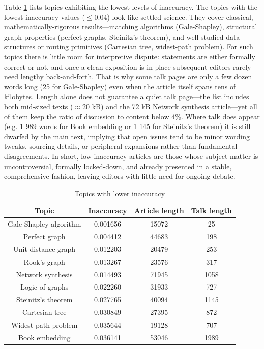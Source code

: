 Table \ref{tab:Lower-inaccuracy-of-topics} lists topics exhibiting the lowest levels of inaccuracy. The topics with the lowest inaccuracy values ($\leq 0.04$) look like settled science. They cover classical, mathematically-rigorous results—matching algorithms (Gale-Shapley), structural graph properties (perfect graphs, Steinitz's theorem), and well-studied data-structures or routing primitives (Cartesian tree, widest-path problem). For such topics there is little room for interpretive dispute: statements are either formally correct or not, and once a clean exposition is in place subsequent editors rarely need lengthy back-and-forth. That is why some talk pages are only a few dozen words long (25 for Gale-Shapley) even when the article itself spans tens of kilobytes. Length alone does not guarantee a quiet talk page—the list includes both mid-sized texts ($\approx 20$ kB) and the 72 kB Network synthesis article—yet all of them keep the ratio of discussion to content below 4\%. Where talk does appear (e.g. 1 989 words for Book embedding or 1 145 for Steinitz's theorem) it is still dwarfed by the main text, implying that open issues tend to be minor wording tweaks, sourcing details, or peripheral expansions rather than fundamental disagreements. In short, low-inaccuracy articles are those whose subject matter is uncontroversial, formally locked-down, and already presented in a stable, comprehensive fashion, leaving editors with little need for ongoing debate.

\begin{table}
\begin{centering}
\begin{tabular}{|c|c|c|c|}
\hline 
Topic & Inaccuracy & Article length & Talk length \tabularnewline
\hline 
\hline
Gale-Shapley algorithm & 0.001656 & 15072 & 25 \tabularnewline
\hline
Perfect graph & 0.004412 & 44683 & 198 \tabularnewline
\hline
Unit distance graph & 0.012203 & 20479 & 253 \tabularnewline
\hline
Rook's graph & 0.013267 & 23576 & 317 \tabularnewline
\hline
Network synthesis & 0.014493 & 71945 & 1058 \tabularnewline
\hline
Logic of graphs & 0.022260 & 31933 & 727 \tabularnewline
\hline
Steinitz's theorem & 0.027765 & 40094 & 1145 \tabularnewline
\hline
Cartesian tree & 0.030849 & 27395 & 872 \tabularnewline
\hline
Widest path problem & 0.035644 & 19128 & 707 \tabularnewline
\hline
Book embedding & 0.036141 & 53046 & 1989 \tabularnewline
\hline
\end{tabular}
\par\end{centering}
\caption{\label{tab:Lower-inaccuracy-of-topics}Topics with lower inaccuracy}
\end{table}

